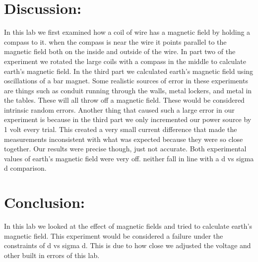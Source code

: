 \documentclass{article}
\begin{document}
\section*{Discussion:}
\doublespace
In this lab we first examined how a coil of wire has a magnetic field by holding a compass to it.  when the compass is near the wire it points parallel to the magnetic field both on the inside and outside of the wire.  In part two of the experiment we rotated the large coils with a compass in the middle to calculate earth's magnetic field.  In the third part we calculated earth's magnetic field using oscillations of a bar magnet.  Some realistic sources of error in these experiments are things such as conduit running through the walls, metal lockers, and metal in the tables.  These will all throw off a magnetic field.  These would be considered intrinsic random errors.  Another thing that caused such a large error in our experiment is because in the third part we only incremented our power source by 1 volt every trial.  This created a very small current difference that made the measurements inconsistent with what was expected because they were so close together.  Our results were precise though, just not accurate.  Both experimental values of earth's magnetic field were very off.  neither fall in line with a d vs sigma d comparison.

  
  


\singlespace
\newpage

\section*{Conclusion:}
In this lab we looked at the effect of magnetic fields and tried to calculate earth's magnetic field.  This experiment would be considered a failure under the constraints of d vs sigma d.  This is due to how close we adjusted the voltage and other built in errors of this lab.
\end{document}
